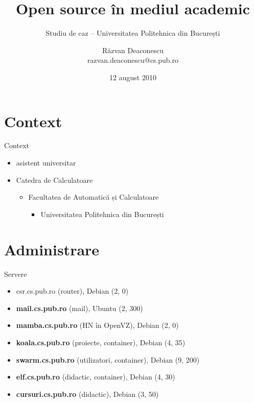 \documentclass{simple}
\title[Open source în mediul academic]{Open source în mediul academic}
\subtitle{Studiu de caz -- Universitatea Politehnica din București}
\institute{Întâlnirile lunare RLUG -- August 2010}
\author[Răzvan Deaconescu]{Răzvan Deaconescu\\
	razvan.deaconescu@cs.pub.ro}
\date{12 august 2010}
\begin{document}
\frame{\titlepage}

\section{Context}

\begin{frame}{Context}
	\begin{itemize}		%
		\item asistent universitar
		\item Catedra de Calculatoare
			\begin{itemize}
				\item Facultatea de Automatică și Calculatoare
					\begin{itemize}
						\item Universitatea Politehnica din București
					\end{itemize}
			\end{itemize}
	\end{itemize}
\end{frame}

\frame{\tableofcontents}

\section{Administrare}

\frame{\tableofcontents[currentsection]}

\begin{frame}{Servere}
	\begin{itemize}
		\item csr.cs.pub.ro (router), Debian (2, 0)
		\item \textbf{mail.cs.pub.ro} (mail), Ubuntu (2, 300)
		\item \textbf{mamba.cs.pub.ro} (HN în OpenVZ), Debian (2, 0)
		\item \textbf{koala.cs.pub.ro} (proiecte, container), Debian (4, 35)
		\item \textbf{swarm.cs.pub.ro} (utilizatori, container), Debian
		(9, 200)
		\item \textbf{elf.cs.pub.ro} (didactic, container), Debian (4, 30)
		\item \textbf{cursuri.cs.pub.ro} (didactic), Debian (3, 50)
	\end{itemize}
\end{frame}
\end{document}
